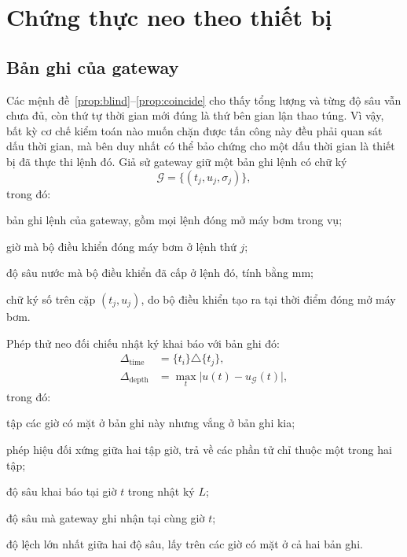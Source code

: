 \section{Chứng thực neo theo thiết bị}
\label{sec:anchor}

\subsection{Bản ghi của gateway}

Các mệnh đề~\ref{prop:blind}--\ref{prop:coincide} cho thấy tổng lượng và từng độ
sâu vẫn chưa đủ, còn thứ tự thời gian mới đúng là thứ bên gian lận thao túng. Vì vậy, bất kỳ cơ chế kiểm toán nào muốn chặn được tấn công này đều phải quan sát
dấu thời gian, mà bên duy nhất có thể bảo chứng cho một dấu thời gian là thiết bị
đã thực thi lệnh đó. Giả sử gateway giữ một bản ghi
lệnh có chữ ký
\begin{equation}
\mathcal{G}=\{(t_j,u_j,\sigma_j)\},
\label{eq:gateway}
\end{equation}
trong đó:
\begin{symbolist}
\item[$\mathcal{G}$] bản ghi lệnh của gateway, gồm mọi lệnh đóng mở máy bơm trong vụ;
\item[$t_j$] giờ mà bộ điều khiển đóng máy bơm ở lệnh thứ $j$;
\item[$u_j$] độ sâu nước mà bộ điều khiển đã cấp ở lệnh đó, tính bằng mm;
\item[$\sigma_j$] chữ ký số trên cặp $(t_j,u_j)$, do bộ điều khiển tạo ra tại thời điểm đóng mở máy bơm.
\end{symbolist}

Phép thử neo đối chiếu nhật ký khai báo với bản ghi đó:
\begin{equation}
\begin{aligned}
\Delta_{\mathrm{time}}&=\{t_i\}\triangle\{t_j\},\\
\Delta_{\mathrm{depth}}&=\max_{t}\bigl|u(t)-u_{\mathcal{G}}(t)\bigr|,
\end{aligned}
\label{eq:deltas}
\end{equation}
trong đó:
\begin{symbolist}
\item[$\Delta_{\mathrm{time}}$] tập các giờ có mặt ở bản ghi này nhưng vắng ở bản ghi kia;
\item[$\triangle$] phép hiệu đối xứng giữa hai tập giờ, trả về các phần tử chỉ thuộc một trong hai tập;
\item[$u(t)$] độ sâu khai báo tại giờ $t$ trong nhật ký $L$;
\item[$u_{\mathcal{G}}(t)$] độ sâu mà gateway ghi nhận tại cùng giờ $t$;
\item[$\Delta_{\mathrm{depth}}$] độ lệch lớn nhất giữa hai độ sâu, lấy trên các giờ có mặt ở cả hai bản ghi.
\end{symbolist}

